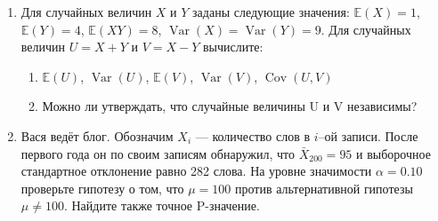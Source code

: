\documentclass[pdftex,12pt,a4paper]{article}
\DeclareMathOperator{\Var}{Var} %
\DeclareMathOperator{\Cov}{Cov} %
\newcommand{\E}{\mathbb{E}} %
\begin{document}
\begin{enumerate}
\item Для случайных величин $X$ и $Y$ заданы следующие значения: $\E(X)=1$, $\E(Y)=4$, $\E(XY)=8$, $\Var(X)=\Var(Y)=9$. Для случайных величин $U=X+Y$ и $V=X-Y$ вычислите: 
\begin{enumerate}
\item $\E(U)$, $\Var(U)$, $\E(V)$, $\Var(V)$, $\Cov(U,V)$ 
\item Можно ли утверждать, что случайные величины U и V независимы? 
\end{enumerate}

\item Вася ведёт блог. Обозначим $X_i$ --- количество слов в $i$--ой записи. После первого года он по своим записям обнаружил, что $\bar{X}_{200}=95$ и выборочное стандартное отклонение равно 282 слова. На уровне значимости $\alpha=0.10$ проверьте гипотезу о том, что $\mu=100$ против альтернативной гипотезы $\mu\neq 100$. Найдите также точное P-значение.


\end{enumerate}
\end{document}
